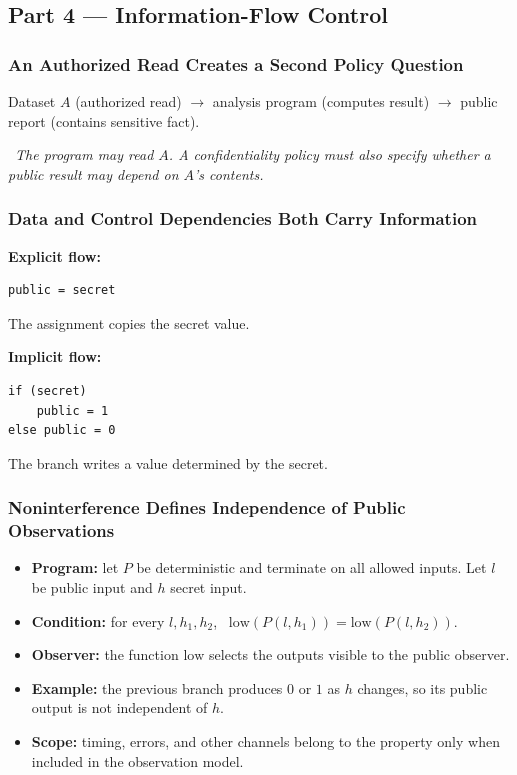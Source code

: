 \documentclass[hidelinks]{article}
\newcommand{\callout}[1]{\par\smallskip\noindent{\color{capri}$\blacktriangleright$}\ \textit{#1}\par\smallskip}
\begin{document}
\subsection{Part 4 --- Information-Flow Control}

\subsubsection{An Authorized Read Creates a Second Policy Question}

Dataset $A$ (authorized read) $\to$ analysis program (computes result) $\to$ public report (contains sensitive fact).

\callout{The program may read $A$. A confidentiality policy must also specify whether a public result may depend on $A$'s contents.}

\subsubsection{Data and Control Dependencies Both Carry Information}

\textbf{Explicit flow:}
\begin{verbatim}
public = secret
\end{verbatim}
The assignment copies the secret value.

\textbf{Implicit flow:}
\begin{verbatim}
if (secret)
    public = 1
else public = 0
\end{verbatim}
The branch writes a value determined by the secret.

\subsubsection{Noninterference Defines Independence of Public Observations}

\begin{itemize}
    \item \textbf{Program:} let $P$ be deterministic and terminate on all allowed inputs. Let $l$ be public input and $h$ secret input.
    \item \textbf{Condition:} for every $l, h_1, h_2$, \ $\mathrm{low}(P(l, h_1)) = \mathrm{low}(P(l, h_2))$.
    \item \textbf{Observer:} the function $\mathrm{low}$ selects the outputs visible to the public observer.
    \item \textbf{Example:} the previous branch produces $0$ or $1$ as $h$ changes, so its public output is not independent of $h$.
    \item \textbf{Scope:} timing, errors, and other channels belong to the property only when included in the observation model.
\end{itemize}
\end{document}

